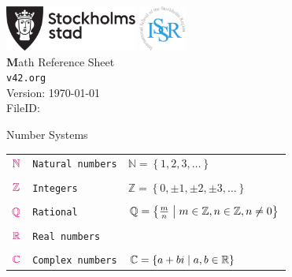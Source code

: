\documentclass[10pt,landscape]{article}
\newcommand{\documenttitle}{Math Reference Sheet}
\newcommand{\documentsubtitle}{v42.org}
\newcommand{\cRed}[1]{{\color{sthlmRed}{#1}}}
\newcommand{\set}[1]{\left\{#1\right\}}
\newcommand{\suchthat}{\;\ifnum\currentgrouptype=16 \middle\fi|\;}
\begin{document}
\raggedright
\footnotesize
\begin{multicols}{3}


\setlength{\premulticols}{1pt}
\setlength{\postmulticols}{1pt}
\setlength{\multicolsep}{1pt}
\setlength{\columnsep}{2pt}


\includegraphics[height=4em]{stockholmstad}	\hspace{0.5cm} \includegraphics[height=4em]{issr} \\
\vspace{0.5cm}
{\Large\textbf\documenttitle} \\
\vspace{0.5cm}
\texttt{\documentsubtitle} \\

Version: \today\\
FileID: \jobname


\begin{mysection}{Number Systems}

\begin{tabular}{@{}ll@{}l@{}}

$\cRed{\mathbb{N}}$	& \texttt{Natural numbers}
							& \qquad $\mathbb{N}=\set{1, 2, 3, \ldots }$ \\
							&& \\
$\cRed{\mathbb{Z}}$  	& \texttt{Integers}
							& \qquad $\mathbb{Z}=\set{0, \pm 1, \pm 2, \pm 3, \ldots}$ \\
							&& \\
$\cRed{\mathbb{Q}}$  	& \texttt{Rational}
							& \qquad $\mathbb{Q}=\set{\frac{m}{n} \suchthat m \in \mathbb{Z}, n \in \mathbb{Z}, n \ne 0}$ \\
							&& \\
$\cRed{\mathbb{R}}$  	& \texttt{Real numbers}
							&  \\
							&& \\
$\cRed{\mathbb{C}}$  	& \texttt{Complex numbers}
							& \qquad $\mathbb{C}=\set{a+bi \suchthat a, b \in \mathbb{R}}$
\end{tabular}
\end{mysection}


\end{multicols}
\end{document}
